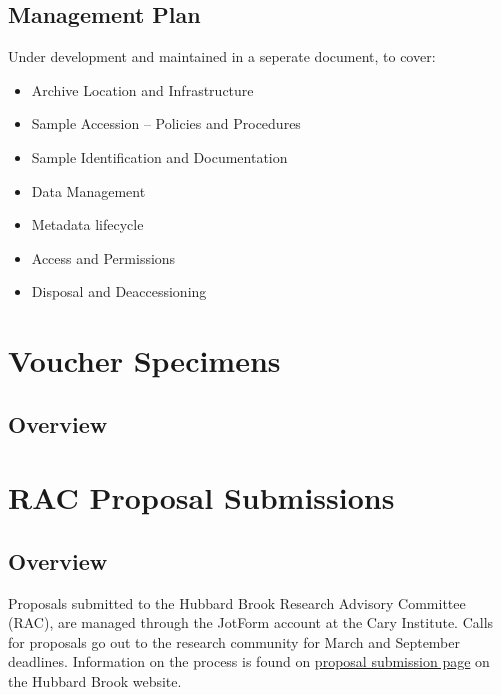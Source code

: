 \documentclass[
  letterpaper,
  DIV=11,
  numbers=noendperiod]{scrreprt}
\providecommand{\tightlist}{%
  \setlength{\itemsep}{0pt}\setlength{\parskip}{0pt}}\usepackage{longtable,booktabs,array}
\begin{document}
\section{Management Plan}\label{management-plan}

Under development and maintained in a seperate document, to cover:

\begin{itemize}
\tightlist
\item
  Archive Location and Infrastructure
\item
  Sample Accession -- Policies and Procedures
\item
  Sample Identification and Documentation
\item
  Data Management
\item
  Metadata lifecycle
\item
  Access and Permissions
\item
  Disposal and Deaccessioning
\end{itemize}


\chapter{Voucher Specimens}\label{voucher-specimens}

\section{Overview}\label{overview-5}


\chapter{RAC Proposal Submissions}\label{rac-proposal-submissions}

\section{Overview}\label{overview-6}

Proposals submitted to the Hubbard Brook Research Advisory Committee
(RAC), are managed through the JotForm account at the Cary Institute.
Calls for proposals go out to the research community for March and
September deadlines. Information on the process is found on
\href{https://hubbardbrook.org/research-proposal-submission/}{proposal
submission page} on the Hubbard Brook website.
\end{document}

